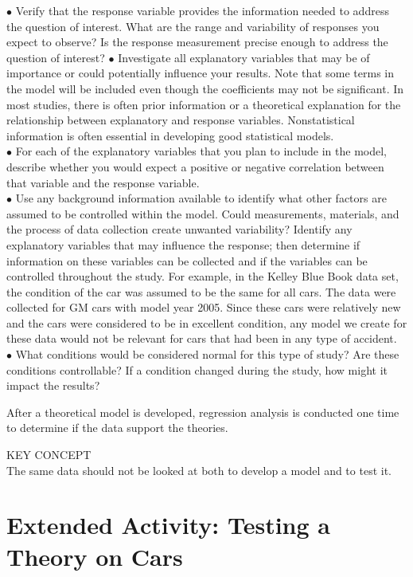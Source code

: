 \documentclass[
]{report}
\begin{document}
\(\bullet\) Verify that the response variable provides the information needed to address the question of interest. What are the range and variability of responses you expect to observe? Is the response measurement precise enough to address the question of interest?
\(\bullet\) Investigate all explanatory variables that may be of importance or could potentially influence your results. Note that some terms in the model will be included even though the coefficients may not be significant. In most studies, there is often prior information or a theoretical explanation for the relationship between explanatory and response variables. Nonstatistical information is often essential in developing good statistical models.\\
\(\bullet\) For each of the explanatory variables that you plan to include in the model, describe whether you would expect a positive or negative correlation between that variable and the response variable.\\
\(\bullet\) Use any background information available to identify what other factors are assumed to be controlled within the model. Could measurements, materials, and the process of data collection create unwanted variability? Identify any explanatory variables that may influence the response; then determine if information on these variables can be collected and if the variables can be controlled throughout the study. For example, in the Kelley Blue Book data set, the condition of the car was assumed to be the same for all cars. The data were collected for GM cars with model year 2005. Since these cars were relatively new and the cars were considered to be in excellent condition, any model we create for these data would not be relevant for cars that had been in any type of accident.\\
\(\bullet\) What conditions would be considered normal for this type of study? Are these conditions controllable? If a condition changed during the study, how might it impact the results?

After a theoretical model is developed, regression analysis is conducted one time to determine if the data support the theories.

KEY CONCEPT\\
The same data should not be looked at both to develop a model and to test it.

\section*{Extended Activity: Testing a Theory on Cars}\label{extended-activity-testing-a-theory-on-cars}
\end{document}
